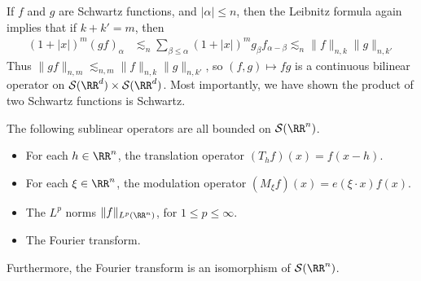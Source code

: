 If $f$ and $g$ are Schwartz functions, and $|\alpha| \leq n$, then the Leibnitz formula again implies that if $k + k' = m$, then
%
\begin{align*}
	(1 + |x|)^m (gf)_\alpha &\lesssim_n \sum_{\beta \leq \alpha} (1 + |x|)^m g_\beta f_{\alpha - \beta} \lesssim_n \| f \|_{n,k} \| g \|_{n,k'}
\end{align*}
%
Thus $\| gf \|_{n,m} \lesssim_{n,m} \| f \|_{n,k} \| g \|_{n,k'}$, so $(f,g) \mapsto fg$ is a continuous bilinear operator on $\mathcal{S}(\RR^d) \times \mathcal{S}(\RR^d)$. Most importantly, we have shown the product of two Schwartz functions is Schwartz.

\begin{theorem}
	The following sublinear operators are all bounded on $\mathcal{S}(\RR^n)$.
	\begin{itemize}
		\item For each $h \in \RR^n$, the translation operator $(T_h f)(x) = f(x - h)$.

		\item For each $\xi \in \RR^n$, the modulation operator $(M_\xi f)(x) = e(\xi \cdot x) f(x)$.

		\item The $L^p$ norms $\| f \|_{L^p(\RR^n)}$, for $1 \leq p \leq \infty$.

		\item The Fourier transform.
	\end{itemize}
	Furthermore, the Fourier transform is an isomorphism of $\mathcal{S}(\RR^n)$.
\end{theorem}
